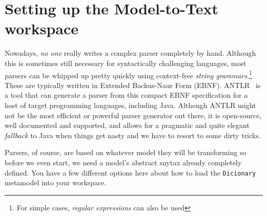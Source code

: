 \newpage
\section{Setting up the Model-to-Text workspace}
\genHeader

Nowadays, \emph{no one} really writes a complex parser completely by hand. Although this is sometimes still necessary for syntactically challenging languages,
most parsers can be whipped up pretty quickly using context-free \emph{string grammars}.\footnote{For simple cases, \emph{regular expressions} can also be used}
These are typically written in Extended Backus-Naur Form (EBNF). ANTLR~\cite{ANTLR} is a tool that can generate a parser from this compact EBNF
specification for a host of target programming languages, including Java. Although ANTLR might not be the most efficient or powerful parser generator out there,
it is open-source, well documented and supported, and allows for a pragmatic and quite elegant \emph{fallback} to Java when things get nasty and we have to
resort to some dirty tricks.

Parsers, of course, are based on whatever model they will be transforming so before we even start, we need a model's abstract snytax already completely defined.
You have a few different options here about how to load the \texttt{Dicionary} metamodel into your workspace.

